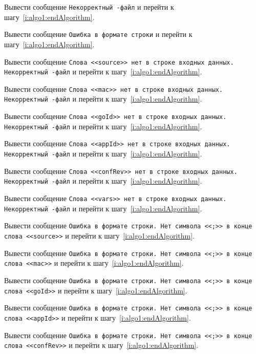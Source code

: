 \begin{enumerate_step}
    \item \label{i:algo1:invalidSid} Вывести сообщение \texttt{Некорректный \cid-файл} и перейти к шагу~\ref{i:algo1:endAlgorithm}.
    \item \label{i:algo1:errorStringFormat} Вывести сообщение \texttt{Ошибка в формате строки} и перейти к шагу~\ref{i:algo1:endAlgorithm}.
    \item \label{i:algo1:notSource} Вывести сообщение \texttt{Слова <<source>> нет в строке входных данных. Некорректный \cid-файл} и перейти к шагу~\ref{i:algo1:endAlgorithm}.
    \item \label{i:algo1:notMac} Вывести сообщение \texttt{Слова <<mac>> нет в строке входных данных. Некорректный \cid-файл} и перейти к шагу~\ref{i:algo1:endAlgorithm}.
    \item \label{i:algo1:notGoId} Вывести сообщение \texttt{Слова <<goId>> нет в строке входных данных. Некорректный \cid-файл} и перейти к шагу~\ref{i:algo1:endAlgorithm}.
    \item \label{i:algo1:notAppId} Вывести сообщение \texttt{Слова <<appId>> нет в строке входных данных. Некорректный \cid-файл} и перейти к шагу~\ref{i:algo1:endAlgorithm}.
    \item \label{i:algo1:notConfRev} Вывести сообщение \texttt{Слова <<confRev>> нет в строке входных данных. Некорректный \cid-файл} и перейти к шагу~\ref{i:algo1:endAlgorithm}.
    \item \label{i:algo1:notVars} Вывести сообщение \texttt{Слова <<vars>> нет в строке входных данных. Некорректный \cid-файл} и перейти к шагу~\ref{i:algo1:endAlgorithm}.

    \item \label{i:algo1:errorStringFormatSource} Вывести сообщение \texttt{Ошибка в формате строки. Нет символа <<;>> в конце слова <<source>>} и перейти к шагу~\ref{i:algo1:endAlgorithm}.
    \item \label{i:algo1:errorStringFormatMac} Вывести сообщение \texttt{Ошибка в формате строки. Нет символа
    <<;>> в конце слова <<mac>>} и перейти к шагу~\ref{i:algo1:endAlgorithm}.
    \item \label{i:algo1:errorStringFormatGoId} Вывести сообщение \texttt{Ошибка в формате строки. Нет символа
    <<;>> в конце слова <<goId>>} и перейти к шагу~\ref{i:algo1:endAlgorithm}.
    \item \label{i:algo1:errorStringFormatAppId} Вывести сообщение \texttt{Ошибка в формате строки. Нет символа <<;>> в конце слова <<appId>>} и перейти к шагу~\ref{i:algo1:endAlgorithm}.
    \item \label{i:algo1:errorStringFormatConfRev} Вывести сообщение \texttt{Ошибка в формате строки. Нет символа <<;>> в конце слова <<confRev>>} и перейти к шагу~\ref{i:algo1:endAlgorithm}.


\end{enumerate_step}
